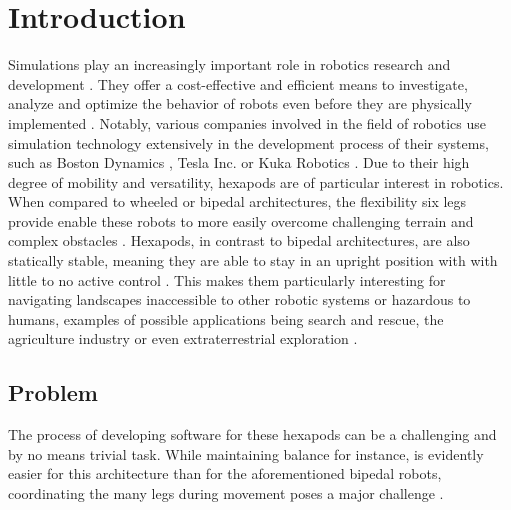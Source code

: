 \chapter{Introduction}
\label{ch:introduction}

Simulations play an increasingly important role in robotics research and development \parencite{afzal2020study}. 
They offer a cost-effective and efficient means to investigate, analyze and optimize the behavior of robots even before they are physically implemented \parencite{de2019analysis}. 
Notably, various companies involved in the field of robotics use simulation technology extensively in the development process of their systems, such as Boston Dynamics \parencite{BostonDynamicsSimulation}, Tesla Inc. \parencite{TeslaAiDay2022} or Kuka Robotics \parencite{KukaSim}.
Due to their high degree of mobility and versatility, hexapods are of particular interest in robotics. 
When compared to wheeled or bipedal architectures, the flexibility six legs provide enable these robots to more easily overcome challenging terrain and complex obstacles \parencite{barai2013smart, atifystructure}.
Hexapods, in contrast to bipedal architectures, are also statically stable, meaning they are able to stay in an upright position with with little to no active control \parencite{azayev2020blind}. 
This makes them particularly interesting for navigating landscapes inaccessible to other robotic systems or hazardous to humans, examples of possible applications being search and rescue, the agriculture industry or even extraterrestrial exploration \parencite{trotta2022walking, billah2008walking}.

\section{Problem}
The process of developing software for these hexapods can be a challenging and by no means trivial task. %
While maintaining balance for instance, is evidently easier for this architecture than for the aforementioned bipedal robots, coordinating the many legs during movement poses a major challenge \parencite{azayev2020blind,schilling2013walknet}.

